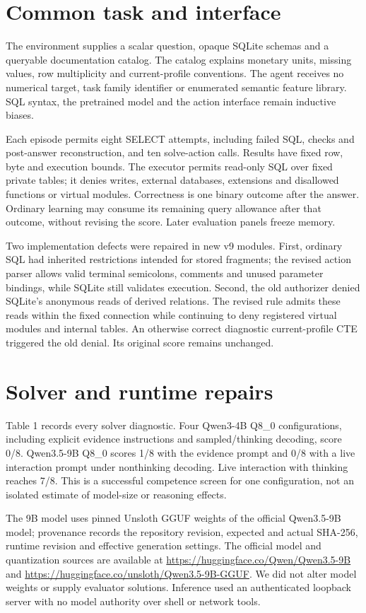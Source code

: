 \documentclass[10pt,twocolumn]{article}
\begin{document}
\section{Common task and interface}
The environment supplies a scalar question, opaque SQLite schemas and a
queryable documentation catalog. The catalog explains monetary units, missing
values, row multiplicity and current-profile conventions. The agent receives
no numerical target, task family identifier or enumerated semantic feature
library. SQL syntax, the pretrained model and the action interface remain
inductive biases.

Each episode permits eight SELECT attempts, including failed SQL, checks and
post-answer reconstruction, and ten solve-action calls. Results have fixed
row, byte and execution bounds. The executor permits read-only SQL over fixed
private tables; it denies writes, external databases, extensions and disallowed
functions or virtual modules. Correctness is one binary outcome after the
answer. Ordinary learning may consume its remaining query allowance after that
outcome, without revising the score. Later evaluation panels freeze memory.

Two implementation defects were repaired in new v9 modules. First, ordinary
SQL had inherited restrictions intended for stored fragments; the revised action
parser allows valid terminal semicolons, comments and unused parameter bindings,
while SQLite still validates execution. Second, the old authorizer denied
SQLite's anonymous reads of derived relations. The revised rule admits these
reads within the fixed connection while continuing to deny registered virtual
modules and internal tables. An otherwise correct diagnostic current-profile
CTE triggered the old denial. Its original score remains unchanged.

\section{Solver and runtime repairs}

Table 1 records every solver diagnostic. Four Qwen3-4B Q8\_0 configurations,
including explicit evidence instructions and sampled/thinking decoding, score
0/8. Qwen3.5-9B Q8\_0 scores 1/8 with the evidence prompt and 0/8 with a live
interaction prompt under nonthinking decoding. Live interaction with thinking
reaches 7/8. This is a successful competence screen for one configuration, not
an isolated estimate of model-size or reasoning effects.

The 9B model uses pinned Unsloth GGUF weights of the official Qwen3.5-9B model;
provenance records the repository revision, expected and actual SHA-256, runtime
revision and effective generation settings. The official model and quantization
sources are available at \url{https://huggingface.co/Qwen/Qwen3.5-9B} and
\url{https://huggingface.co/unsloth/Qwen3.5-9B-GGUF}. We did not alter model
weights or supply evaluator solutions. Inference used an authenticated loopback
server with no model authority over shell or network tools.
\end{document}
